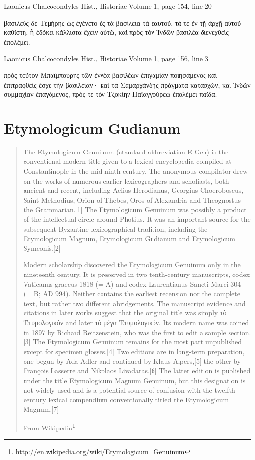 \documentclass[12pt,letterpaper,twoside,final]{memoir}
\begin{document}
\begin{greek}
Laonicus Chalcocondyles Hist., Historiae 
Volume 1, page 154, line 20

                  βασιλεὺς δὲ Τεμήρης ὡς ἐγένετο ἐς τὰ βασίλεια 
τὰ ἑαυτοῦ, τά τε ἐν τῇ ἀρχῇ αὐτοῦ καθίστη, ᾗ ἐδόκει κάλλιστα 
ἔχειν αὐτῷ, καὶ πρὸς τὸν Ἰνδῶν βασιλέα διενεχθεὶς ἐπολέμει. 



Laonicus Chalcocondyles Hist., Historiae 
Volume 1, page 156, line 3

                                          πρὸς τοῦτον Μπαϊμπούρης   
τῶν ἐννέα βασιλέων ἐπιγαμίαν ποιησάμενος καὶ ἐπιτραφθεὶς ἔσχε 
τὴν βασιλείαν· καὶ τὰ Σαμαρχάνδης πράγματα κατασχών, καὶ 
Ἰνδῶν συμμαχίαν ἐπαγόμενος, πρός τε τὸν Τζοκίην Παϊαγγούρεω 
ἐπολέμει παῖδα. 

\end{greek}


\section{Etymologicum Gudianum}

\blockquote[From Wikipedia\footnote{\url{http://en.wikipedia.org/wiki/Etymologicum_Genuinum}}]{The Etymologicum Genuinum (standard abbreviation E Gen) is the conventional modern title given to a lexical encyclopedia compiled at Constantinople in the mid ninth century. The anonymous compilator drew on the works of numerous earlier lexicographers and scholiasts, both ancient and recent, including Aelius Herodianus, Georgius Choeroboscus, Saint Methodius, Orion of Thebes, Oros of Alexandria and Theognostus the Grammarian.[1] The Etymologicum Genuinum was possibly a product of the intellectual circle around Photius. It was an important source for the subsequent Byzantine lexicographical tradition, including the Etymologicum Magnum, Etymologicum Gudianum and Etymologicum Symeonis.[2]

Modern scholarship discovered the Etymologicum Genuinum only in the nineteenth century. It is preserved in two tenth-century manuscripts, codex Vaticanus graecus 1818 (= A) and codex Laurentianus Sancti Marci 304 (= B; AD 994). Neither contains the earliest recension nor the complete text, but rather two different abridgements. The manuscript evidence and citations in later works suggest that the original title was simply τὸ Ἐτυμολογικόν and later τὸ μέγα Ἐτυμολογικόν. Its modern name was coined in 1897 by Richard Reitzenstein, who was the first to edit a sample section.[3] The Etymologicum Genuinum remains for the most part unpublished except for specimen glosses.[4] Two editions are in long-term preparation, one begun by Ada Adler and continued by Klaus Alpers,[5] the other by François Lasserre and Nikolaos Livadaras.[6] The latter edition is published under the title Etymologicum Magnum Genuinum, but this designation is not widely used and is a potential source of confusion with the twelfth-century lexical compendium conventionally titled the Etymologicum Magnum.[7]}
\end{document}
